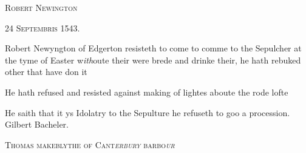 \documentclass[12pt, a4paper]{book}
\begin{document}
				\begin{center} \begin{large} {\scshape Robert Newington} \end{large} \end{center}
			
               
               	
				\begin{center}  {\scshape 24 Septembris
               		1543.}  \end{center}
			

               	
               		
				\marginpar[\vspace{0.5cm}{\textcolor{Gray}{Robert Newyngton}}]{}
			
               		
		\ifthenelse{\isodd{\thepage}}
		{\reversemarginpar}
		{\normalmarginpar}
		Robert Newyngton of Edgerton resisteth to come to comme
               			to the Sepulcher at the tyme of Easter w\textit{ith}oute their
               			were brede and drinke their, he hath rebuked other
               			that have don it
               	
               	
               		
				\marginpar[\vspace{0.5cm}{\textcolor{Gray}{Injunctions}}]{}
			
               		
		\ifthenelse{\isodd{\thepage}}
		{\reversemarginpar}
		{\normalmarginpar}
		He hath refused and resisted against making of lightes
               			aboute the rode lofte
               	
               	
               		
				\marginpar[\vspace{0.5cm}{\textcolor{Gray}{ceremonies}}]{}
			
               		
		\ifthenelse{\isodd{\thepage}}
		{\reversemarginpar}
		{\normalmarginpar}
		He saith that it ys Idolatry to the Sepulture
               			he refuseth to goo a procession. Gilbert Bacheler.
               	
 

            
            
            	
				\begin{center} \begin{large} {\scshape Thomas makeblythe of Cant\textit{erbury} barbo\textit{ur}} \end{large} \end{center}
			
\end{document}
